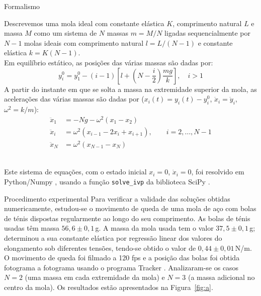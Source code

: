\documentclass[final]{beamer}
\newlength{\colwidth}
\begin{document}
\begin{frame}[t,fragile]
\begin{columns}[t]
\begin{column}{\colwidth}
\begin{block}{Formalismo}
\begin{minipage}{0.7\colwidth}
	Descrevemos uma mola ideal com constante elástica $K$, comprimento natural $L$ e massa $M$ como um sistema de $N$ massas $m=M/N$ ligadas sequencialmente por $N-1$ molas ideais com comprimento natural \linebreak $l=L/(N-1)$ e constante elástica $k=K(N-1)$.\\[1ex]   
	Em equilíbrio estático, as posições das várias massas são dadas por:
	\begin{equation*}
		y_i^0=y_1^0-(i-1)\left[l+\left(N-\frac{i}{2}\right)\frac{mg}{k}\right],
		\quad i>1
	\end{equation*}
	A partir do instante em que se solta a massa na extremidade superior da mola, as acelerações das várias massas são dadas por ($x_i(t)=y_i(t)-y_i^0$, $\ddot x_i=\ddot y_i$, $\omega^2=k/m$):
	\begin{align*}
		\ddot x_1 &=-Ng-\omega^2(x_1-x_2)\\
		\ddot x_i &= \omega^2(x_{i-1}-2x_i+x_{i+1}),\qquad i=2, \ldots, N-1\\
		\ddot x_{N} &=\omega^2(x_{N-1}-x_{N})
	\end{align*}
\end{minipage}\\[1cm]
Este sistema de equações, com o estado inicial $x_i=0$, $\dot x_i=0$, foi resolvido em Python/Numpy \cite{harris2020array}, usando a função
\texttt{solve\_ivp} da biblioteca SciPy \cite{2020SciPy-NMeth}.
\end{block}


\begin{block}{Procedimento experimental}
Para verificar a validade das soluções obtidas numericamente, estudou-se o
movimento de queda de uma mola de aço com bolas de ténis dispostas
regularmente ao longo do seu comprimento.  As bolas de ténis usadas têm massa
$56,6\pm0,1$\,g.  A massa da mola usada tem o valor $37,5\pm0,1$\,g;
determinou a sua constante elástica por regressão linear dos valores do
elongamento sob diferentes tensões, tendo-se obtido o valor de
$0,44\pm0,01$\,N/m.  O movimento de queda foi filmado a 120 fps e a posição das
bolas foi obtida fotograma a fotograma usando o programa Tracker \cite{Tracker}.
Analizaram-se os casos $N=2$ (uma massa em cada extremidade da mola) e $N=3$ (a
massa adicional no centro da mola). Os resultados estão apresentados na
Figura~\ref{fig:a}.


\end{block}
\end{column}
\end{columns}
\end{frame}
\end{document}
